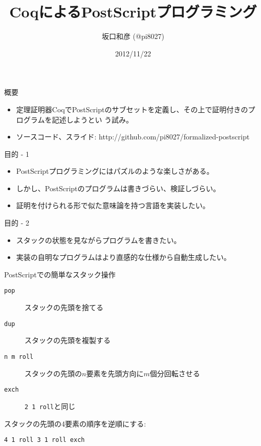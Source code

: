 \documentclass[cjk, 12pt]{beamer}
\title{CoqによるPostScriptプログラミング}
\author{坂口和彦 (@pi8027)}
\institute{筑波大学 情報学群 情報科学類 B2}
\date{2012/11/22}
\begin{document}
\begin{frame}[plain]

 \maketitle

\end{frame}

\begin{frame}{概要}

 \begin{itemize}
  \item 定理証明器CoqでPostScriptのサブセットを定義し、その上で証明付きのプログラムを記述しようとい
	う試み。
  \item ソースコード、スライド: http://github.com/pi8027/formalized-postscript
 \end{itemize}

\end{frame}

\begin{frame}{目的 - 1}

 \begin{itemize}
  \item PostScriptプログラミングにはパズルのような楽しさがある。
  \item しかし、PostScriptのプログラムは書きづらい、検証しづらい。
  \item 証明を付けられる形で似た意味論を持つ言語を実装したい。
 \end{itemize}

\end{frame}

\begin{frame}{目的 - 2}

 \begin{itemize}
  \item スタックの状態を見ながらプログラムを書きたい。
  \item 実装の自明なプログラムはより直感的な仕様から自動生成したい。
 \end{itemize}

\end{frame}

\begin{frame}[fragile]{PostScriptでの簡単なスタック操作}

 \begin{description}
  \item[\texttt{pop}] スタックの先頭を捨てる
  \item[\texttt{dup}] スタックの先頭を複製する
  \item[\texttt{n m roll}] スタックの先頭の$n$要素を先頭方向に$m$個分回転させる
  \item[\texttt{exch}] \texttt{2 1 roll}と同じ
 \end{description}

 スタックの先頭の4要素の順序を逆順にする:

\begin{lstlisting}[style=postscript]
4 1 roll 3 1 roll exch
\end{lstlisting}

\end{frame}
\end{document}
